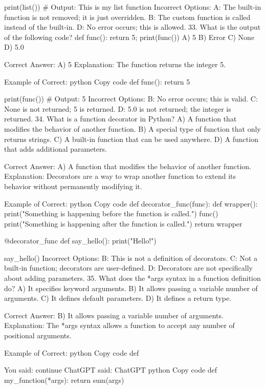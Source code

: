 print(list())  # Output: This is my list function
Incorrect Options:
A: The built-in function is not removed; it is just overridden.
B: The custom function is called instead of the built-in.
D: No error occurs; this is allowed.
33. What is the output of the following code? def func(): return 5; print(func())
A) 5
B) Error
C) None
D) 5.0

Correct Answer: A) 5
Explanation: The function returns the integer 5.

Example of Correct:
python
Copy code
def func():
    return 5

print(func())  # Output: 5
Incorrect Options:
B: No error occurs; this is valid.
C: None is not returned; 5 is returned.
D: 5.0 is not returned; the integer is returned.
34. What is a function decorator in Python?
A) A function that modifies the behavior of another function.
B) A special type of function that only returns strings.
C) A built-in function that can be used anywhere.
D) A function that adds additional parameters.

Correct Answer: A) A function that modifies the behavior of another function.
Explanation: Decorators are a way to wrap another function to extend its behavior without permanently modifying it.

Example of Correct:
python
Copy code
def decorator_func(func):
    def wrapper():
        print("Something is happening before the function is called.")
        func()
        print("Something is happening after the function is called.")
    return wrapper

@decorator_func
def say_hello():
    print("Hello!")

say_hello()
Incorrect Options:
B: This is not a definition of decorators.
C: Not a built-in function; decorators are user-defined.
D: Decorators are not specifically about adding parameters.
35. What does the *args syntax in a function definition do?
A) It specifies keyword arguments.
B) It allows passing a variable number of arguments.
C) It defines default parameters.
D) It defines a return type.

Correct Answer: B) It allows passing a variable number of arguments.
Explanation: The *args syntax allows a function to accept any number of positional arguments.

Example of Correct:
python
Copy code
def





You said:
continue
ChatGPT said:
ChatGPT
python
Copy code
  def my_function(*args):
      return sum(args)
  
